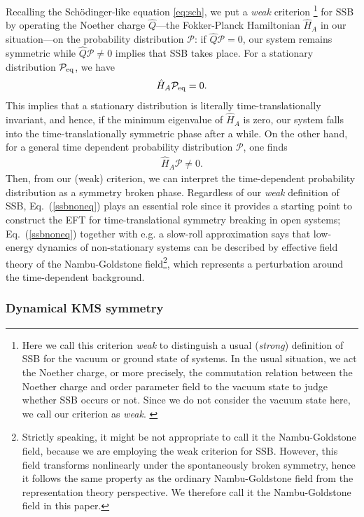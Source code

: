 \documentclass[a4paper,11pt]{article}
\newcommand{\Pcal}{{\mathcal{P}}}
\begin{document}
\medskip
Recalling the Sch\"odinger-like equation \eqref{eq:sch}, 
we put a \textit{weak} criterion%
\footnote{
Here we call this criterion \textit{weak} to distinguish a usual 
(\textit{strong}) definition of SSB for the vacuum or ground state of systems.
In the usual situation, we act the Noether charge, 
or more precisely, the commutation relation between the Noether charge and 
order parameter field to the vacuum state to judge whether SSB occurs or not. 
Since we do not consider the vacuum state here, we call our criterion 
as \textit{weak}.
\label{footnote4}}
for SSB by operating the Noether charge $\hat{Q}$---the Fokker-Planck 
Hamiltonian $\hat{H}_A$ in our situation---on the probability distribution 
$\Pcal$: if $\hat Q \Pcal = 0$, our system remains symmetric 
while $\hat Q \Pcal \neq 0$ implies that SSB takes place.
For a stationary distribution $\Pcal_{\rm eq}$, we have 
\begin{align}
 \hat H_A \Pcal_{\rm eq} = 0.\label{nonssbeq}
\end{align}
This implies that a stationary distribution is literally 
time-translationally invariant, 
and hence, if the minimum eigenvalue of $\hat{H}_A$ is zero, our system falls into the time-translationally symmetric phase after a while.
On the other hand, 
for a general time dependent probability
distribution $\Pcal$, one finds
\begin{align}
 \hat H_A \Pcal \neq 0. \label{ssbnoneq}
\end{align}
Then, from our (weak) criterion, 
we can interpret the time-dependent probability distribution as 
a symmetry broken phase.
Regardless of our \textit{weak} definition of SSB,
Eq.~(\ref{ssbnoneq}) plays an essential role since it provides 
a starting point to construct the EFT
for time-translational symmetry breaking in open systems;
Eq.~(\ref{ssbnoneq}) together with e.g. a slow-roll approximation
says that low-energy dynamics of non-stationary systems can be described by 
effective field theory of the Nambu-Goldstone field\footnote{
Strictly speaking, it might be not appropriate to call it the Nambu-Goldstone field, because we are employing the weak criterion for SSB. However, this field transforms nonlinearly under the spontaneously broken symmetry, hence it follows the same property as the ordinary Nambu-Goldstone field from the representation theory perspective. We therefore call it the Nambu-Goldstone field in this paper.},
which represents a perturbation around
the time-dependent background.


\subsubsection{Dynamical KMS symmetry}
\label{subsec:KMS_B}
\end{document}

